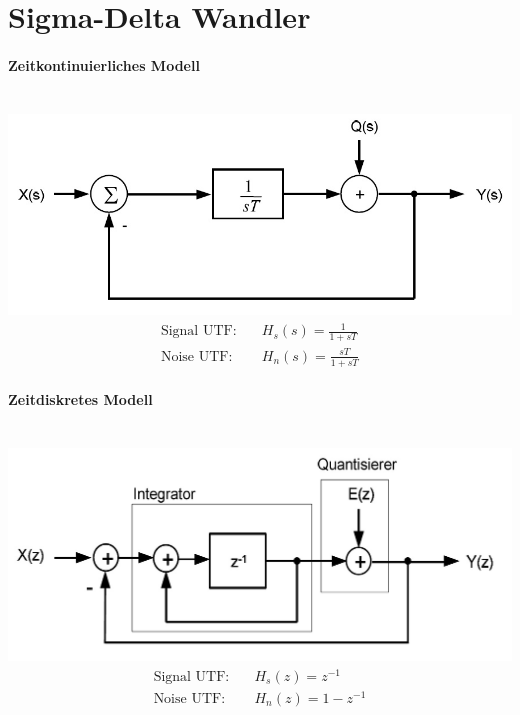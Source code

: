 \section{Sigma-Delta Wandler}

\begin{multicols}{2}
	\paragraph{Zeitkontinuierliches Modell} ~\\
	\includegraphics[width=0.8\linewidth]{images/sigma_delta.jpg}
	\begin{align*}
		\text{Signal UTF:} \quad & H_s(s) = \frac{1}{1+sT} \\
		\text{Noise UTF:} \quad & H_n(s) = \frac{sT}{1+sT}
	\end{align*}
	\vfill\columnbreak
	\paragraph{Zeitdiskretes Modell} ~\\
	\includegraphics[width=0.8\linewidth]{images/sigma_delta_diskret.jpg}
	\begin{align*}
		\text{Signal UTF:} \quad & H_s(z) = z^{-1} \\
		\text{Noise UTF:} \quad & H_n(z) = 1-z^{-1}
	\end{align*}
\end{multicols}

